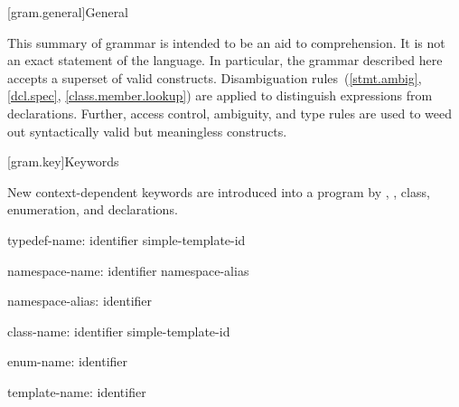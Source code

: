 
[gram.general]{General}

\pnum
{}%
%
This summary of \Cpp{} grammar is intended to be an aid to comprehension.
It is not an exact statement of the language.
In particular, the grammar described here accepts
a superset of valid \Cpp{} constructs.
Disambiguation rules~(\ref{stmt.ambig}, \ref{dcl.spec}, \ref{class.member.lookup})
are applied to distinguish expressions from declarations.
Further, access control, ambiguity, and type rules are used
to weed out syntactically valid but meaningless constructs.

[gram.key]{Keywords}

\pnum
{}%
New context-dependent keywords are introduced into a program by
,
,
class, enumeration, and
declarations.

\begin{ncbnf}
typedef-name:\br
	identifier\br
	simple-template-id
\end{ncbnf}

\begin{ncbnf}
namespace-name:\br
	identifier\br
	namespace-alias
\end{ncbnf}

\begin{ncbnf}
namespace-alias:\br
	identifier
\end{ncbnf}

\begin{ncbnf}
class-name:\br
	identifier\br
	simple-template-id
\end{ncbnf}

\begin{ncbnf}
enum-name:\br
	identifier
\end{ncbnf}

\begin{ncbnf}
template-name:\br
	identifier
\end{ncbnf}

\FlushAndPrintGrammar
